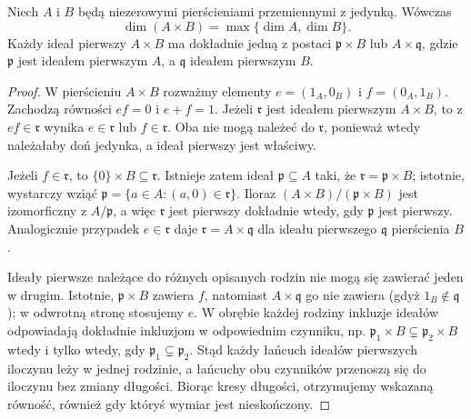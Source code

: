 \begin{twierdzenie}
\label{aa:tw:krull-product-dimension}
Niech $A$ i $B$ będą niezerowymi pierścieniami przemiennymi
z jedynką. Wówczas
\[
 \dim(A\times B)=\max\{\dim A,\dim B\}.
\]
Każdy ideał pierwszy $A\times B$ ma dokładnie jedną
z postaci $\mathfrak p\times B$ lub $A\times\mathfrak q$,
gdzie $\mathfrak p$ jest ideałem pierwszym $A$, a
$\mathfrak q$ ideałem pierwszym $B$.
\end{twierdzenie}
\begin{proof}
W pierścieniu $A\times B$ rozważmy elementy
$e=(1_A,0_B)$ i $f=(0_A,1_B)$. Zachodzą równości
$ef=0$ i $e+f=1$. Jeżeli $\mathfrak r$ jest ideałem
pierwszym $A\times B$, to z $ef\in\mathfrak r$ wynika
$e\in\mathfrak r$ lub $f\in\mathfrak r$. Oba nie mogą
należeć do $\mathfrak r$, ponieważ wtedy należałaby doń
jedynka, a ideał pierwszy jest właściwy.

Jeżeli $f\in\mathfrak r$, to $\{0\}\times B\subseteq
\mathfrak r$. Istnieje zatem ideał $\mathfrak p\subseteq A$
taki, że $\mathfrak r=\mathfrak p\times B$; istotnie,
wystarczy wziąć $\mathfrak p=\{a\in A:(a,0)\in\mathfrak r\}$.
Iloraz $(A\times B)/(\mathfrak p\times B)$ jest izomorficzny
z $A/\mathfrak p$, a więc $\mathfrak r$ jest pierwszy
dokładnie wtedy, gdy $\mathfrak p$ jest pierwszy.
Analogicznie przypadek $e\in\mathfrak r$ daje
$\mathfrak r=A\times\mathfrak q$ dla ideału pierwszego
$\mathfrak q$ pierścienia $B$.

Ideały pierwsze należące do różnych opisanych rodzin
nie mogą się zawierać jeden w drugim. Istotnie,
$\mathfrak p\times B$ zawiera $f$, natomiast
$A\times\mathfrak q$ go nie zawiera (gdyż
$1_B\notin\mathfrak q$); w odwrotną stronę stosujemy $e$.
W obrębie każdej rodziny inkluzje ideałów odpowiadają
dokładnie inkluzjom w odpowiednim czynniku, np.
$\mathfrak p_1\times B\subsetneq\mathfrak p_2\times B$
wtedy i tylko wtedy, gdy
$\mathfrak p_1\subsetneq\mathfrak p_2$.
Stąd każdy łańcuch ideałów pierwszych iloczynu leży w jednej
rodzinie, a łańcuchy obu czynników przenoszą się do iloczynu
bez zmiany długości. Biorąc kresy długości, otrzymujemy
wskazaną równość, również gdy któryś wymiar jest nieskończony.
\end{proof}

